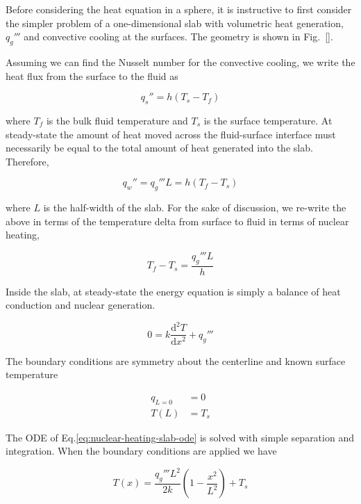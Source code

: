 Before considering the heat equation in a sphere, it is instructive to first consider the simpler problem of a one-dimensional slab with volumetric heat generation, $q_g'''$ and convective cooling at the surfaces. The geometry is shown in Fig.~\ref{}.

Assuming we can find the Nusselt number for the convective cooling, we write the heat flux from the surface to the fluid as

\begin{equation}
	q_s'' = h(T_s - T_f)	
\end{equation}

where $T_f$ is the bulk fluid temperature and $T_s$ is the surface temperature. At steady-state the amount of heat moved across the fluid-surface interface must necessarily be equal to the total amount of heat generated into the slab. Therefore,

\begin{equation}
	q_w'' = q_g'''L = h(T_f-T_s)
\end{equation}

where $L$ is the half-width of the slab. For the sake of discussion, we re-write the above in terms of the temperature delta from surface to fluid in terms of nuclear heating,

\begin{equation}\label{eq:fluid-delta}
	T_f-T_s = \frac{q_g'''L}{h}
\end{equation}

Inside the slab, at steady-state the energy equation is simply a balance of heat conduction and nuclear generation. 

\begin{equation}\label{eq:nuclear-heating-slab-ode}
	0 = k\frac{\mathrm{d}^2T}{\mathrm{d}x^2} + q_g'''
\end{equation}

The boundary conditions are symmetry about the centerline and known surface temperature

\begin{align}
	q_{L=0} &= 0 \\
	T(L) &= T_s
\end{align}

The ODE of Eq.\ref{eq:nuclear-heating-slab-ode} is solved with simple separation and integration. When the boundary conditions are applied we have

\begin{equation}
	T(x) = \frac{q_g''' L^2}{2k}\left(1-\frac{x^2}{L^2}\right) + T_s
\end{equation}

